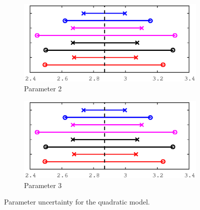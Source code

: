 \documentclass[11pt,a4paper,oneside]{report}
\begin{document}
\begin{figure}
  \begin{subfigure}[b]{0.5\textwidth}
    \includegraphics[width=\textwidth, trim=0 0 0 0,clip=true]{figures/task5/uncert_model2_param2.eps}
    \caption{Parameter 2}
  \end{subfigure}%
  \begin{subfigure}[b]{0.5\textwidth}
    \includegraphics[width=\textwidth, trim=0 0 0 0,clip=true]{figures/task5/uncert_model2_param2.eps}
    \caption{Parameter 3}
  \end{subfigure}%
  
  \caption{Parameter uncertainty for the quadratic model.}
  \label{fig:c5uncertM1}
  
\end{figure}
\end{document}
